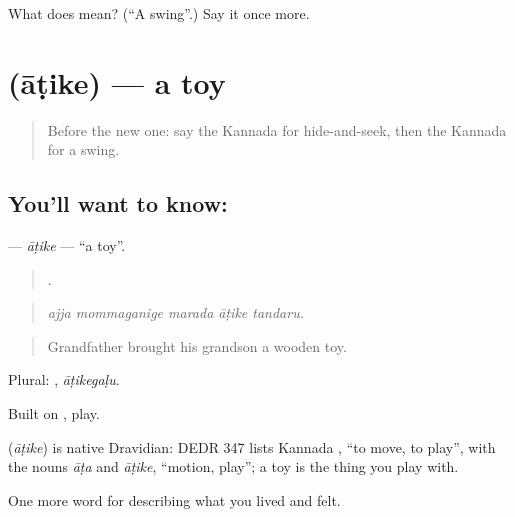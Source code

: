 \begin{tcolorbox}[breakable,colback=teal!4,colframe=teal!35!black,title={Before you move on}]
What does  mean? (\textquotedblleft{}A swing\textquotedblright{}.) Say it once more.
\end{tcolorbox}
\section[\texorpdfstring{\kn{ಆಟಿಕೆ} (āṭike)}{ಆಟಿಕೆ (āṭike)}]{ (āṭike) — a toy}

\label{lesson:KA-C531-atike}



\begin{quote}
Before the new one: say the Kannada for hide-and-seek, then the Kannada for a swing.
\end{quote}

\subsection*{You'll want to know: }
\textbf{} — \emph{āṭike} — \textquotedblleft{}a toy\textquotedblright{}.

\begin{quote}
    .
\end{quote}

\begin{quote}
\emph{ajja mommaganige marada āṭike tandaru.}
\end{quote}

\begin{quote}
Grandfather brought his grandson a wooden toy.
\end{quote}

Plural: , \emph{āṭikegaḷu}.

Built on , play.

\begin{cousinweb}
\textbf{} (\emph{āṭike}) is native Dravidian: DEDR 347 lists Kannada , \textquotedblleft{}to move, to play\textquotedblright{}, with the nouns \emph{āṭa} and \emph{āṭike}, \textquotedblleft{}motion, play\textquotedblright{}; a toy is the thing you play with.
\end{cousinweb}

\begin{grammarlens}[title={What you've built}]
One more word for describing what you lived and felt.
\end{grammarlens}

